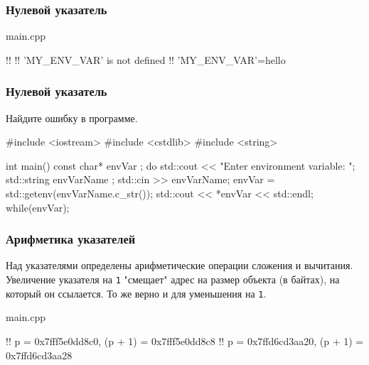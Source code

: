 \documentclass[compress, 8pt]{beamer}
\begin{document}
\begin{frame}[fragile]

    \frametitle{Нулевой указатель}

    \hfill \break

        {main.cpp}

    \begin{terminalwindow}
!!
!!
'MY_ENV_VAR' is not defined
!!
'MY_ENV_VAR'=hello
    \end{terminalwindow}

\end{frame}

\begin{frame}[fragile]

    \frametitle{Нулевой указатель}

    \begin{task}
        Найдите ошибку в программе.
    \end{task}

    \begin{myinplacelisting}[minted language=cpp]
#include <iostream>
#include <cstdlib>
#include <string>

int main() {
    const char* envVar {};
    do {
        std::cout << "Enter environment variable: ";
        std::string envVarName {};
        std::cin >> envVarName;
        envVar = std::getenv(envVarName.c_str());
        std::cout << *envVar << std::endl;
    }
    while(envVar);
}
    \end{myinplacelisting}

\end{frame}

\begin{frame}[fragile]

    \frametitle{Арифметика указателей}

    \hfill \break

    Над указателями определены арифметические операции сложения и вычитания.
    Увеличение указателя на \verb|1| "смещает" адрес на размер объекта
    (в байтах), на который он ссылается.
    То же верно и для уменьшения на \verb|1|.

        {main.cpp}

    \begin{terminalwindow}
!!
p = 0x7fff5e0dd8c0, (p + 1) = 0x7fff5e0dd8c8
!!
p = 0x7ffd6cd3aa20, (p + 1) = 0x7ffd6cd3aa28
    \end{terminalwindow}

\end{frame}
\end{document}
